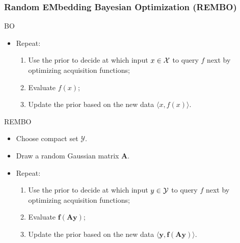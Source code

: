 \documentclass[grey]{beamer}
\begin{document}
 \begin{frame}
  \frametitle{Random EMbedding Bayesian Optimization (REMBO)}
  
  \begin{block}{BO}
   \begin{itemize}
   \item Repeat:
   \begin{enumerate}
    \item Use the prior to decide at which input $x \in \cal X$ to query $f$ next
    by optimizing acquisition functions;
    \item Evaluate $f(x)$;
    \item Update the prior based on the new data 
    $\langle{}x, f(x)\rangle$.
   \end{enumerate} 
  \end{itemize}
  \end{block}
  
   
  \begin{block}{REMBO}
    \begin{itemize}
   \item Choose compact set {\bf \textcolor{myColor}{$\mathbf{\mathcal{Y}}$}}.
   \item Draw a random Gaussian matrix \textcolor{myColor}{$\mathbf{A}$}.
   \item Repeat:
   \begin{enumerate}
    \item Use the prior to decide at which input $y \in \cal Y$ to query $f$ next
    by optimizing acquisition functions;
    \item Evaluate {\bf \textcolor{myColor}{$\mathbf{f(Ay)}$}};
    \item Update the prior based on the new data 
    {\bf \textcolor{myColor}{$\mathbf{\langle{}y, f(Ay)\rangle}$}}.
   \end{enumerate}
  \end{itemize}
  \end{block}

  
 \end{frame}
\end{document}
